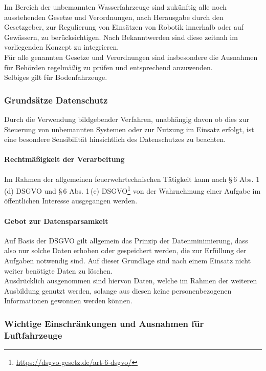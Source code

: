 Im Bereich der unbemannten Wasserfahrzeuge sind zukünftig alle noch ausstehenden Gesetze und Verordnungen, nach Herausgabe durch den Gesetzgeber, zur Regulierung von Einsätzen von Robotik innerhalb oder auf Gewässern, zu berücksichtigen. Nach Bekanntwerden sind diese zeitnah im vorliegenden Konzept zu integrieren.\\

\noindent Für alle genannten Gesetze und Verordnungen sind insbesondere die Ausnahmen für Behörden regelmäßig zu prüfen und entsprechend anzuwenden.\\

\noindent Selbiges gilt für Bodenfahrzeuge.

\subsubsection{Grundsätze Datenschutz}

Durch die Verwendung bildgebender Verfahren, unabhängig davon ob dies zur Steuerung von unbemannten Systemen oder zur Nutzung im Einsatz erfolgt, ist eine besondere Sensibilität hinsichtlich des Datenschutzes zu beachten.

\paragraph{Rechtmäßigkeit der Verarbeitung}

Im Rahmen der allgemeinen feuerwehrtechnischen Tätigkeit kann nach §\,6 Abs. 1\,(d) DSGVO und §\,6 Abs. 1\,(e) DSGVO\footnote{\url{https://dsgvo-gesetz.de/art-6-dsgvo/}} von der Wahrnehmung einer Aufgabe im öffentlichen Interesse ausgegangen werden.

\paragraph{Gebot zur Datensparsamkeit}

Auf Basis der DSGVO gilt allgemein das Prinzip der Datenminimierung, dass also nur solche Daten erhoben oder gespeichert werden, die zur Erfüllung der Aufgaben notwendig sind. Auf dieser Grundlage sind nach einem Einsatz nicht weiter benötigte Daten zu löschen.\\

\noindent Ausdrücklich ausgenommen sind hiervon Daten, welche im Rahmen der weiteren Ausbildung genutzt werden, solange aus diesen keine personenbezogenen Informationen gewonnen werden können.

\subsubsection{Wichtige Einschränkungen und Ausnahmen für Luftfahrzeuge}

